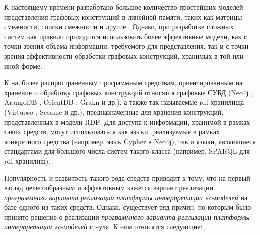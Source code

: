 \begin{SCn}
{	К настоящему времени разработано большое количество простейших моделей представления графовых конструкций в линейной памяти, таких как матрицы смежности, списки смежности и другие . Однако, при разработке сложных систем как правило приходится использовать более эффективные модели, как с точки зрения объема информации, требуемого для представления, так и с точки зрения эффективности обработки графовых конструкций, хранимых в той или иной форме.
	
	К наиболее распространенным программным средствам, ориентированным на хранение и обработку графовых конструкций относятся графовые СУБД (Neo4j , ArangoDB , OrientDB , Grakn  и др.), а также так называемые rdf-хранилища (Virtuoso , Sesame  и др.), предназначенные для хранения конструкций, представленных в модели RDF. Для доступа к информации, хранимой в рамках таких средств, могут использоваться как языки, реализуемые в рамках конкретного средства (например, язык Cypher в Neo4j), так и языки, являющиеся стандартами для большого числа систем такого класса (например, SPARQL для rdf-хранилищ).
	
	Популярность и развитость такого рода средств приводит к тому, что на первый взгляд целесообразным и эффективным кажется вариант реализации \textit{программного варианта реализации платформы интерпретации sc-моделей} на базе одного из таких средств. Однако, существует ряд причин, по которым было принято решение о реализации \textit{программного варианта реализации платформы интерпретации sc-моделей} с нуля. К ним относятся следующие:
	
}
\end{SCn}
